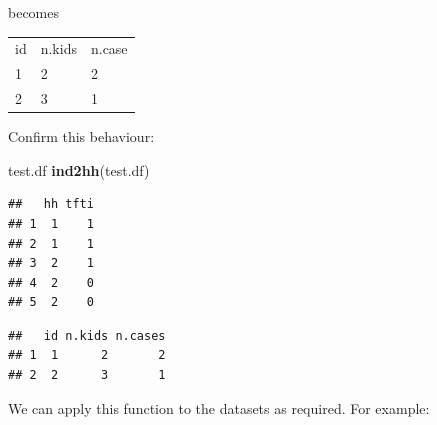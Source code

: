\documentclass[12pt,a4paper]{book}
\newenvironment{Shaded}{\begin{snugshade}}{\end{snugshade}}
\newcommand{\KeywordTok}[1]{\textcolor[rgb]{0.13,0.29,0.53}{\textbf{#1}}}
\newcommand{\NormalTok}[1]{#1}
\theoremstyle{definition}
\theoremstyle{definition}
\theoremstyle{definition}
\theoremstyle{remark}
\begin{document}
becomes

\begin{longtable}[]{@{}lll@{}}
\toprule
\endhead
\begin{minipage}[t]{0.08\columnwidth}\raggedright
id\strut
\end{minipage} & \begin{minipage}[t]{0.14\columnwidth}\raggedright
n.kids\strut
\end{minipage} & \begin{minipage}[t]{0.14\columnwidth}\raggedright
n.case\strut
\end{minipage}\tabularnewline
\begin{minipage}[t]{0.08\columnwidth}\raggedright
1\strut
\end{minipage} & \begin{minipage}[t]{0.14\columnwidth}\raggedright
2\strut
\end{minipage} & \begin{minipage}[t]{0.14\columnwidth}\raggedright
2\strut
\end{minipage}\tabularnewline
\begin{minipage}[t]{0.08\columnwidth}\raggedright
2\strut
\end{minipage} & \begin{minipage}[t]{0.14\columnwidth}\raggedright
3\strut
\end{minipage} & \begin{minipage}[t]{0.14\columnwidth}\raggedright
1\strut
\end{minipage}\tabularnewline
\bottomrule
\end{longtable}

Confirm this behaviour:

\begin{Shaded}
\begin{Highlighting}[]
\NormalTok{test.df}
\KeywordTok{ind2hh}\NormalTok{(test.df)}
\end{Highlighting}
\end{Shaded}

\begin{verbatim}
##   hh tfti
## 1  1    1
## 2  1    1
## 3  2    1
## 4  2    0
## 5  2    0
\end{verbatim}

\begin{verbatim}
##   id n.kids n.cases
## 1  1      2       2
## 2  2      3       1
\end{verbatim}

We can apply this function to the datasets as required. For example:
\end{document}
